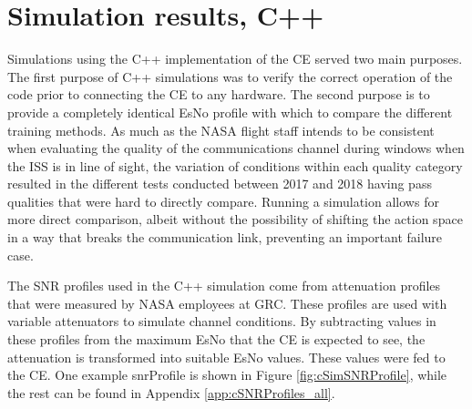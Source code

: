 \section{Simulation results, C++}
\par Simulations using the C++ implementation of the CE served two main purposes. The first purpose of C++ simulations was to verify the correct operation of the code prior to connecting the CE to any hardware. The second purpose is to provide a completely identical EsNo profile with which to compare the different training methods. As much as the NASA flight staff intends to be consistent when evaluating the quality of the communications channel during windows when the ISS is in line of sight, the variation of conditions within each quality category resulted in the different tests conducted between 2017 and 2018 having pass qualities that were hard to directly compare. Running a simulation allows for more direct comparison, albeit without the possibility of shifting the action space in a way that breaks the communication link, preventing an important failure case.
\par The SNR profiles used in the C++ simulation come from attenuation profiles that were measured by NASA employees at GRC. These profiles are used with variable attenuators to simulate channel conditions. By subtracting values in these profiles from the maximum EsNo that the CE is expected to see, the attenuation is transformed into suitable EsNo values. These values were fed to the CE. One example snrProfile is shown in Figure \ref{fig:cSimSNRProfile}, while the rest can be found in Appendix \ref{app:cSNRProfiles_all}. 

